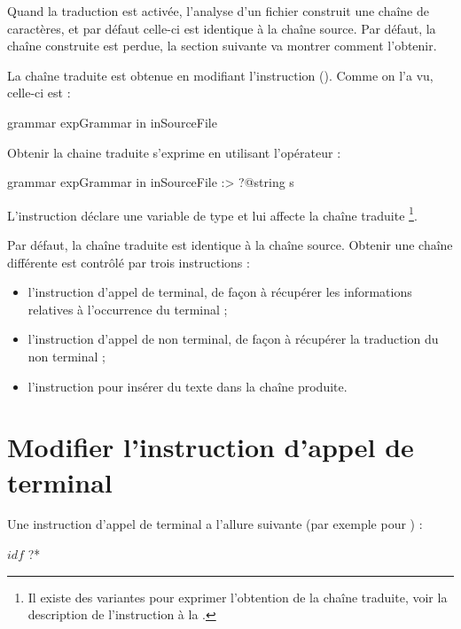 Quand la traduction est activée, l'analyse d'un fichier construit une chaîne de caractères, et par défaut celle-ci est identique à la chaîne source. Par défaut, la chaîne construite est perdue, la section suivante va montrer comment l'obtenir.









La chaîne traduite est obtenue en modifiant l'instruction  (). Comme on l'a vu, celle-ci est : 
\begin{galgascode}
grammar expGrammar in inSourceFile
\end{galgascode}

Obtenir la chaine traduite s'exprime en utilisant l'opérateur  \galgas{\:>} :
\begin{galgascode}
grammar expGrammar in inSourceFile :> ?@string s
\end{galgascode}

L'instruction déclare une variable  de type  et lui affecte la chaîne traduite \footnote{Il existe des variantes pour exprimer l'obtention de la chaîne traduite, voir la description de l'instruction  à la .}.

Par défaut, la chaîne traduite est identique à la chaîne source. Obtenir une chaîne différente est contrôlé par trois instructions :
\begin{itemize}
  \item l'instruction d'appel de terminal, de façon à récupérer les informations relatives à l'occurrence du terminal ;
  \item l'instruction d'appel de non terminal, de façon à récupérer la traduction du non terminal ;
  \item l'instruction  pour insérer du texte dans la chaîne produite.
\end{itemize}







\section{Modifier l'instruction d'appel de terminal}

Une instruction d'appel de terminal a l'allure suivante (par exemple pour ) :
\begin{galgascode}
$idf$ ?*
\end{galgascode}


